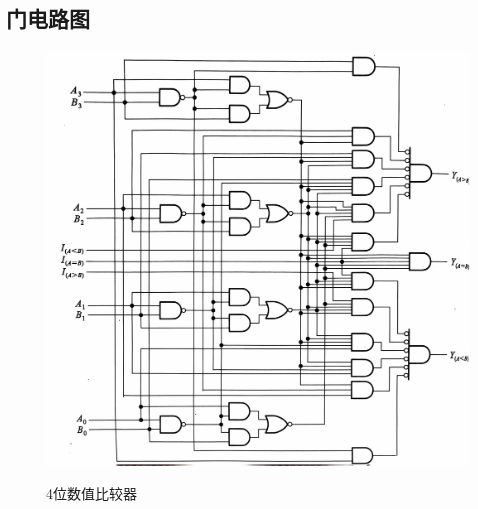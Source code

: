 \documentclass[fontset=windows,12pt]{article}
\begin{document}
    \subsection{门电路图}
    \begin{figure}[ht]

        \begin{minipage}[t]{0.5\linewidth}  \label{Fig.4}      %
            \centering
            \hspace{2mm}
            \includegraphics[width=1\textwidth]{4位数值比较器.jpg}
            \caption{4位数值比较器}
        \end{minipage}
        \begin{minipage}[t]{0.5\linewidth}  \label{Fig.4}      %
            \centering
            \hspace{2mm}

\end{minipage}
\end{figure}
\end{document}
